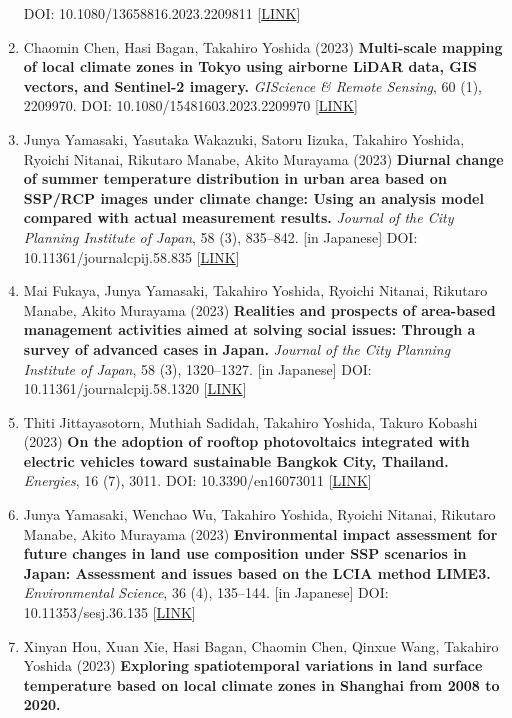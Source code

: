\documentclass[
]{book}
\begin{document}
\begin{enumerate}
  DOI: 10.1080/13658816.2023.2209811 {[}\href{https://www.tandfonline.com/doi/full/10.1080/13658816.2023.2209811}{LINK}{]}
\item
  Chaomin Chen, Hasi Bagan, Takahiro Yoshida (2023)
  \textbf{Multi-scale mapping of local climate zones in Tokyo using airborne LiDAR data, GIS vectors, and Sentinel-2 imagery.}
  \emph{GIScience \& Remote Sensing}, 60 (1), 2209970.
  DOI: 10.1080/15481603.2023.2209970 {[}\href{https://www.tandfonline.com/doi/full/10.1080/15481603.2023.2209970}{LINK}{]}
\item
  Junya Yamasaki, Yasutaka Wakazuki, Satoru Iizuka, Takahiro Yoshida, Ryoichi Nitanai, Rikutaro Manabe, Akito Murayama (2023)
  \textbf{Diurnal change of summer temperature distribution in urban area based on SSP/RCP images under climate change: Using an analysis model compared with actual measurement results.}
  \emph{Journal of the City Planning Institute of Japan}, 58 (3), 835--842. {[}in Japanese{]}
  DOI: 10.11361/journalcpij.58.835 {[}\href{https://doi.org/10.11361/journalcpij.58.835}{LINK}{]}
\item
  Mai Fukaya, Junya Yamasaki, Takahiro Yoshida, Ryoichi Nitanai, Rikutaro Manabe, Akito Murayama (2023)
  \textbf{Realities and prospects of area-based management activities aimed at solving social issues: Through a survey of advanced cases in Japan.}
  \emph{Journal of the City Planning Institute of Japan}, 58 (3), 1320--1327. {[}in Japanese{]}
  DOI: 10.11361/journalcpij.58.1320 {[}\href{https://doi.org/10.11361/journalcpij.58.1320}{LINK}{]}
\item
  Thiti Jittayasotorn, Muthiah Sadidah, Takahiro Yoshida, Takuro Kobashi (2023)
  \textbf{On the adoption of rooftop photovoltaics integrated with electric vehicles toward sustainable Bangkok City, Thailand.}
  \emph{Energies}, 16 (7), 3011.
  DOI: 10.3390/en16073011 {[}\href{https://www.mdpi.com/1996-1073/16/7/3011}{LINK}{]}
\item
  Junya Yamasaki, Wenchao Wu, Takahiro Yoshida, Ryoichi Nitanai, Rikutaro Manabe, Akito Murayama (2023)
  \textbf{Environmental impact assessment for future changes in land use composition under SSP scenarios in Japan: Assessment and issues based on the LCIA method LIME3.}
  \emph{Environmental Science}, 36 (4), 135--144. {[}in Japanese{]}
  DOI: 10.11353/sesj.36.135 {[}\href{https://doi.org/10.11353/sesj.36.135}{LINK}{]}
\item
  Xinyan Hou, Xuan Xie, Hasi Bagan, Chaomin Chen, Qinxue Wang,
  Takahiro Yoshida (2023)
  \textbf{Exploring spatiotemporal variations in land surface temperature based on local climate zones in Shanghai from 2008 to 2020.}

\end{enumerate}
\end{document}
